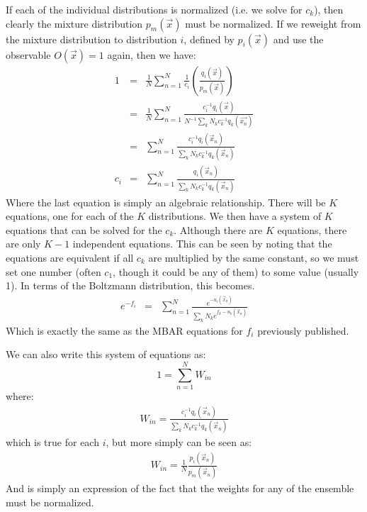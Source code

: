 \documentclass[aps,pre,twocolumn,superscriptaddress]{revtex4-1}
\begin{document}
If each of the individual distributions is normalized (i.e. we solve
for $c_k$), then clearly the mixture distribution $p_m(\vec{x})$ must
be normalized.  If we reweight from the mixture distribution to
distribution $i$, defined by $p_i(\vec{x})$ and use the observable
$O(\vec{x}) = 1$ again, then we have:
\begin{eqnarray} 
  1  &=& \frac{1}{N} \sum_{n=1}^{N}\frac{1}{c_i} \left(\frac{q_i(\vec{x})}{p_m(\vec{x})}\right) \nonumber \\
     &=& \frac{1}{N} \sum_{n=1}^N\frac{c_i^{-1} q_i(\vec{x})}{N^{-1}\sum_k N_k c_k^{-1} q_k(\vec{x_n})} \nonumber \\
     &=& \sum_{n=1}^N \frac{c_i^{-1} q_i(\vec{x}_n)}{\sum_k N_k c_k^{-1} q_k(\vec{x}_n)} \nonumber\\
c_i  &=& \sum_{n=1}^N \frac{q_i(\vec{x}_n)}{\sum_k N_k c_k^{-1} q_k(\vec{x}_n)}
\end{eqnarray}
Where the last equation is simply an algebraic relationship.  There
will be $K$ equations, one for each of the $K$
distributions.  We then have a system of $K$ equations that can be
solved for the $c_k$.  Although there are $K$ equations, there are
only $K-1$ independent equations. This can be seen by noting that the
equations are equivalent if all $c_k$ are multiplied by the same
constant, so we must set one number (often $c_1$, though it could be
any of them) to some value (usually 1). In terms of the Boltzmann
distribution, this becomes.
\begin{eqnarray*}
e^{-f_i}  &=& \sum_{n=1}^N \frac{e^{-u_i(\vec{x}_n)}}{\sum_k N_k e^{f_k - u_k(\vec{x}_n)}}
\end{eqnarray*}
Which is exactly the same as the MBAR equations for $f_i$ previously
published.

We can also write this system of equations as:
\begin{equation*}
1 = \sum_{n=1}^N W_{in}
\end{equation*} 
where: 
\begin{eqnarray*}
W_{in} = \frac{c_i^{-1} q_i(\vec{x}_n)}{\sum_k N_k c_k^{-1} q_k(\vec{x}_n)} 
\end{eqnarray*}
which is true for each $i$, but more simply can be seen as:
\begin{eqnarray}
W_{in} = \frac{1}{N}\frac{p_i(\vec{x}_n)}{p_m(\vec{x}_n)}
\end{eqnarray}
And is simply an expression of the fact that the weights for any of
the ensemble must be normalized.
\end{document}
